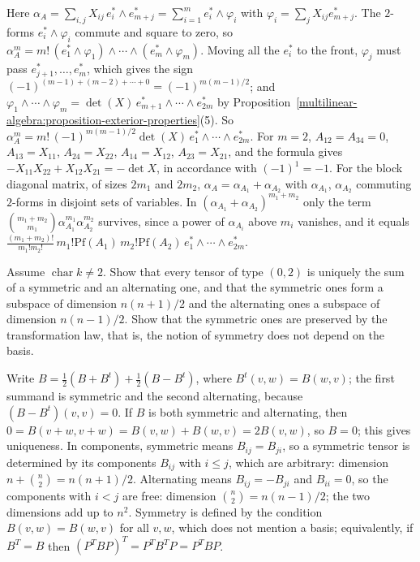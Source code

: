 \begin{solution}
Here $\alpha_A = \sum_{i,j}X_{ij}\,e_i^* \wedge e_{m+j}^* = \sum_{i=1}^me_i^* \wedge \varphi_i$ with $\varphi_i = \sum_jX_{ij}e_{m+j}^*$. The $2$-forms $e_i^* \wedge \varphi_i$ commute and square
to zero, so $\alpha_A^m = m!\,(e_1^* \wedge \varphi_1) \wedge \cdots \wedge (e_m^* \wedge \varphi_m)$. Moving all the $e_i^*$ to the front, $\varphi_j$ must pass $e_{j+1}^*, \ldots, e_m^*$, which
gives the sign $(-1)^{(m-1) + (m-2) + \cdots + 0} = (-1)^{m(m-1)/2}$; and $\varphi_1 \wedge \cdots \wedge \varphi_m = \det(X)\,e_{m+1}^* \wedge \cdots \wedge e_{2m}^*$ by
Proposition~\ref{multilinear-algebra:proposition-exterior-properties}(5). So $\alpha_A^m = m!\,(-1)^{m(m-1)/2}\det(X)\,e_1^* \wedge \cdots \wedge e_{2m}^*$. For $m = 2$,
$A_{12} = A_{34} = 0$, $A_{13} = X_{11}$, $A_{24} = X_{22}$, $A_{14} = X_{12}$, $A_{23} = X_{21}$, and the formula gives $-X_{11}X_{22} + X_{12}X_{21} = -\det X$, in accordance with
$(-1)^{1} = -1$. For the block diagonal matrix, of sizes $2m_1$ and $2m_2$, $\alpha_A = \alpha_{A_1} + \alpha_{A_2}$ with $\alpha_{A_1}$, $\alpha_{A_2}$ commuting $2$-forms in disjoint sets of
variables. In $(\alpha_{A_1} + \alpha_{A_2})^{m_1 + m_2}$ only the term $\binom{m_1 + m_2}{m_1}\alpha_{A_1}^{m_1}\alpha_{A_2}^{m_2}$ survives, since a power of $\alpha_{A_i}$ above $m_i$ vanishes, and it equals
$\frac{(m_1 + m_2)!}{m_1!m_2!}\,m_1!\mathrm{Pf}(A_1)\,m_2!\mathrm{Pf}(A_2)\,e_1^* \wedge \cdots \wedge e_{2m}^*$.
\end{solution}

\begin{exercise}\label{multilinear-algebra:exercise-tensor-symmetric}
Assume $\operatorname{char}k \neq 2$. Show that every tensor of type $(0,2)$ is uniquely the sum of a symmetric and an alternating one, and that the symmetric ones form a subspace of dimension
$n(n+1)/2$ and the alternating ones a subspace of dimension $n(n-1)/2$. Show that the symmetric ones are preserved by the transformation law, that is, the notion of symmetry does not depend on
the basis.
\end{exercise}

\begin{solution}
Write $B = \frac12(B + B^t) + \frac12(B - B^t)$, where $B^t(v, w) = B(w, v)$; the first summand is symmetric and the second alternating, because $(B - B^t)(v, v) = 0$. If $B$ is both symmetric and
alternating, then $0 = B(v + w, v + w) = B(v, w) + B(w, v) = 2B(v, w)$, so $B = 0$; this gives uniqueness. In components, symmetric means $B_{ij} = B_{ji}$, so a symmetric tensor is determined by
its components $B_{ij}$ with $i \leq j$, which are arbitrary: dimension $n + \binom n2 = n(n+1)/2$. Alternating means $B_{ij} = -B_{ji}$ and $B_{ii} = 0$, so the components with $i < j$
are free: dimension $\binom n2 = n(n-1)/2$; the two dimensions add up to $n^2$. Symmetry is defined by the condition $B(v, w) = B(w, v)$ for all $v, w$, which does not mention a basis; equivalently,
if $B^T = B$ then $(P^TBP)^T = P^TB^TP = P^TBP$.
\end{solution}

